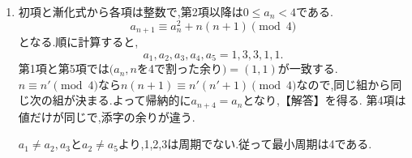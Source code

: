 \noindent {}\par\nobreak
\begin{enumerate}[label=(\arabic*),parsep=3pt,beginpenalty=10000,format=\bookitemlink{example-gauss-role-3}{solution}{problem}]
  \item 初項と漸化式から各項は整数で,第2項以降は$0\le a_n<4$である.
    \[
      a_{n+1}\equiv a_n^2+n(n+1)\pmod4
    \]
    となる.順に計算すると,
    \[
      a_1,a_2,a_3,a_4,a_5=1,3,3,1,1.
    \]
    第1項と第5項では$(a_n,n$を4で割った余り$)=(1,1)$が一致する.
    $n\equiv n'\pmod4$なら$n(n+1)\equiv n'(n'+1)\pmod4$なので,同じ組から同じ次の組が決まる.よって帰納的に$a_{n+4}=a_n$となり,【解答】を得る.
    第4項は値だけが同じで,添字の余りが違う.

    $a_1\ne a_2,a_3$と$a_2\ne a_5$より,1,2,3は周期でない.従って最小周期は4である.
\end{enumerate}
